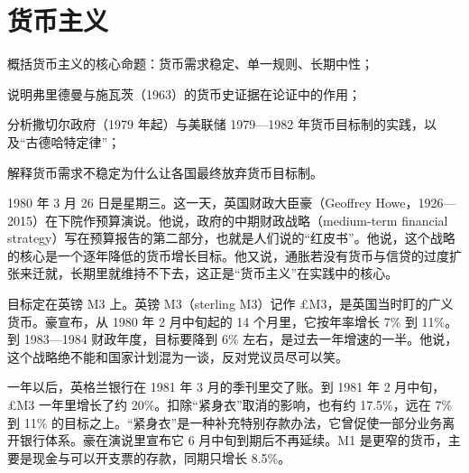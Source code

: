 \chapter{货币主义}\label{ch:monetarism}

\begin{chapterguide}
\begin{guidegoals}
\item 概括货币主义的核心命题：货币需求稳定、单一规则、长期中性；
\item 说明弗里德曼与施瓦茨（1963）的货币史证据在论证中的作用；
\item 分析撒切尔政府（1979 年起）与美联储 1979—1982 年货币目标制的实践，以及“古德哈特定律”；
\item 解释货币需求不稳定为什么让各国最终放弃货币目标制。
\end{guidegoals}
\end{chapterguide}

1980 年 3 月 26 日是星期三。这一天，英国财政大臣豪（Geoffrey Howe，1926—2015）在下院作预算演说\cite{hansard1980,loc45}。他说，政府的中期财政战略（medium-term financial strategy）写在预算报告的第二部分，也就是人们说的“红皮书”\cite{hansard1980}。他说，这个战略的核心是一个逐年降低的货币增长目标\cite{hansard1980}。他又说，通胀若没有货币与信贷的过度扩张来迁就，长期里就维持不下去，这正是“货币主义”在实践中的核心\cite{hansard1980}。

目标定在英镑 M3 上。英镑 M3（sterling M3）记作 £M3，是英国当时盯的广义货币\cite{hansard1986}。豪宣布，从 1980 年 2 月中旬起的 14 个月里，它按年率增长 7\% 到 11\%\cite{hansard1980}。到 1983—1984 财政年度，目标要降到 6\% 左右，是过去一年增速的一半\cite{hansard1980}。他说，这个战略绝不能和国家计划混为一谈，反对党议员尽可以笑\cite{hansard1980}。

一年以后，英格兰银行在 1981 年 3 月的季刊里交了账。到 1981 年 2 月中旬，£M3 一年里增长了约 20\%\cite{boe1981}。扣除“紧身衣”取消的影响，也有约 17.5\%，远在 7\% 到 11\% 的目标之上\cite{boe1981}。“紧身衣”是一种补充特别存款办法，它曾促使一部分业务离开银行体系\cite{boe1981}。豪在演说里宣布它 6 月中旬到期后不再延续\cite{hansard1980}。M1 是更窄的货币，主要是现金与可以开支票的存款，同期只增长 8.5\%\cite{boe1981}。

